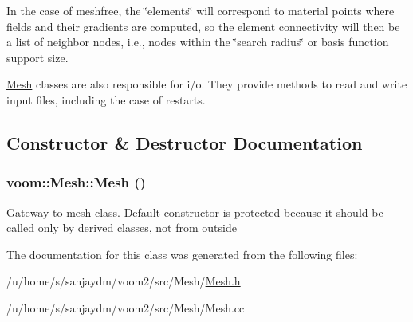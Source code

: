 In the case of meshfree, the \char`\"{}elements\char`\"{} will correspond to material points where fields and their gradients are computed, so the element connectivity will then be a list of neighbor nodes, i.e., nodes within the \char`\"{}search radius\char`\"{} or basis function support size.

\hyperlink{classvoom_1_1_mesh}{Mesh} classes are also responsible for i/o. They provide methods to read and write input files, including the case of restarts. 

\subsection{Constructor \& Destructor Documentation}
\hypertarget{classvoom_1_1_mesh_a6bb4b6118d3eeffcbea587aa8c533ac0}{
\subsubsection[{Mesh}]{\setlength{\rightskip}{0pt plus 5cm}voom::Mesh::Mesh ()}}
\label{classvoom_1_1_mesh_a6bb4b6118d3eeffcbea587aa8c533ac0}


Gateway to mesh class. Default constructor is protected because it should be called only by derived classes, not from outside 

The documentation for this class was generated from the following files:\begin{DoxyCompactItemize}
\item 
/u/home/s/sanjaydm/voom2/src/Mesh/\hyperlink{_mesh_8h}{Mesh.h}\item 
/u/home/s/sanjaydm/voom2/src/Mesh/Mesh.cc\end{DoxyCompactItemize}
